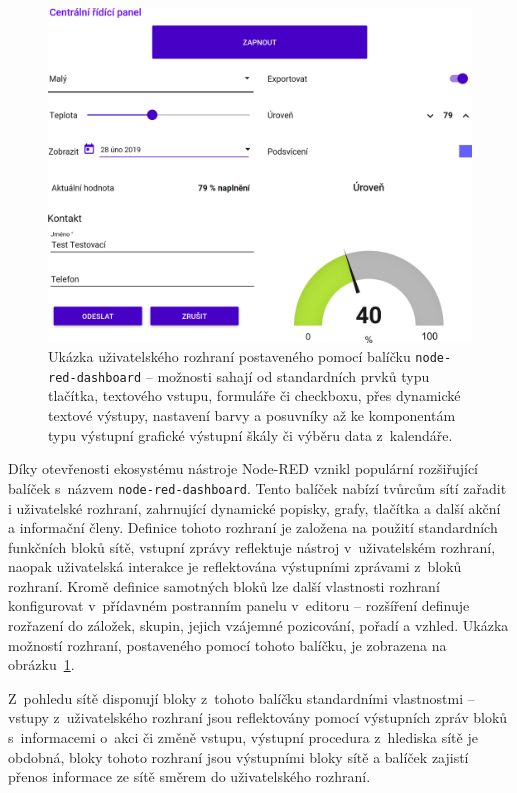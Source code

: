 \begin{figure}[th]
    \centering
    \includegraphics[width=\textwidth]{figures/node-red-dashboard.png}
    \caption{Ukázka uživatelského rozhraní postaveného pomocí balíčku \texttt{node-red-dashboard} -- možnosti sahají
    od standardních prvků typu tlačítka, textového vstupu, formuláře či checkboxu, přes dynamické textové výstupy,
    nastavení barvy a posuvníky až ke komponentám typu výstupní grafické výstupní škály či výběru data z~kalendáře.}
    \label{fig:node-red-dashboard}
\end{figure}

Díky otevřenosti ekosystému nástroje Node-RED vznikl populární rozšiřující balíček s~názvem
\texttt{node-red-dashboard}.
Tento balíček nabízí tvůrcům sítí zařadit i uživatelské rozhraní, zahrnující dynamické
popisky, grafy, tlačítka a další akční a informační členy.
Definice tohoto rozhraní je založena na použití standardních funkčních bloků sítě, vstupní zprávy reflektuje nástroj
v~uživatelském rozhraní, naopak uživatelská interakce je reflektována výstupními zprávami z~bloků rozhraní.
Kromě definice samotných bloků lze další vlastnosti rozhraní konfigurovat v~přídavném postranním panelu v~editoru --
rozšíření definuje rozřazení do záložek, skupin, jejich vzájemné pozicování, pořadí a vzhled.
Ukázka možností rozhraní, postaveného pomocí tohoto balíčku, je zobrazena na obrázku~\ref{fig:node-red-dashboard}.

Z~pohledu sítě disponují bloky z~tohoto balíčku standardními vlastnostmi -- vstupy z~uživatelského rozhraní jsou
reflektovány pomocí výstupních zpráv bloků s~informacemi o~akci či změně vstupu, výstupní procedura z~hlediska sítě
je obdobná, bloky tohoto rozhraní jsou výstupními bloky sítě a balíček zajistí přenos informace ze sítě směrem do
uživatelského rozhraní.

